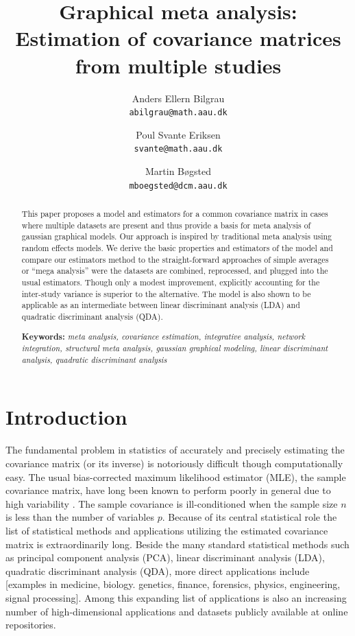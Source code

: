 \documentclass{article}\usepackage[]{graphicx}\usepackage[]{color}
\title{Graphical meta analysis: Estimation of covariance matrices from multiple studies}
\author{
  Anders Ellern Bilgrau \\ \texttt{abilgrau@math.aau.dk} \and
  Poul Svante Eriksen \\ \texttt{svante@math.aau.dk} \and
  Martin B\o{}gsted \\ \texttt{m\textunderscore{}boegsted@dcm.aau.dk}
}
\begin{document}
\maketitle
\begin{abstract}
This paper proposes a model and estimators for a common covariance matrix in cases where multiple datasets are present and thus provide a basis for meta analysis of gaussian graphical models. Our approach is inspired by traditional meta analysis using random effects models. We derive the basic properties and estimators of the model and compare our estimators method to the straight-forward approaches of simple averages or ``mega analysis'' were the datasets are combined, reprocessed, and plugged into the usual estimators. Though only a modest improvement, explicitly accounting for the inter-study variance is superior to the alternative. The model is also shown to be applicable as an intermediate between linear discriminant analysis (LDA) and quadratic discriminant analysis (QDA). \medskip

\noindent \textbf{Keywords:} \textit{meta analysis, covariance estimation, integrative analysis, network integration, structural meta analysis, gaussian graphical modeling, linear discriminant analysis, quadratic discriminant analysis}
\end{abstract}

\newpage
\tableofcontents


\newpage
\section{Introduction}
The fundamental problem in statistics of accurately and precisely estimating the covariance matrix (or its inverse) is notoriously difficult though computationally easy. The usual bias-corrected maximum likelihood estimator (MLE), the sample covariance matrix, have long been known to perform poorly in general due to high variability \citep{Dempster1972}. The sample covariance is ill-conditioned when the sample size $n$ is less than the number of variables $p$. Because of its central statistical role the list of statistical methods and applications utilizing the estimated covariance matrix is extraordinarily long. Beside the many standard statistical methods such as principal component analysis (PCA), linear discriminant analysis (LDA), quadratic discriminant analysis (QDA), more direct applications include [examples in medicine, biology. genetics, finance, forensics, physics, engineering, signal processing]. Among this expanding list of applications is also an increasing number of high-dimensional applications and datasets publicly available at online repositories.
\end{document}

